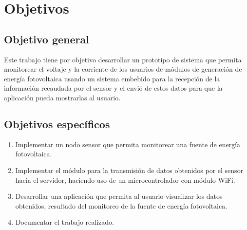 
\section{Objetivos}

\subsection{Objetivo general}
Este trabajo tiene por objetivo desarrollar un prototipo de sistema que permita monitorear el voltaje y la corriente de los usuarios de módulos de generación de energía fotovoltaica usando un sistema embebido para la recepción de la información recaudada por el sensor y el envió de estos datos para que la aplicación pueda mostrarlas al usuario.

\subsection{Objetivos específicos}
\begin{enumerate}[label=\arabic*.]
    \item Implementar un nodo sensor que permita monitorear una fuente de energía fotovoltaica.
    \item Implementar el módulo para la transmisión de datos obtenidos por el sensor hacia el servidor, haciendo uso de un microcontrolador con módulo WiFi. 
    \item Desarrollar una aplicación que permita al usuario visualizar los datos obtenidos, resultado del monitoreo de la fuente de energía fotovoltaica.
    \item Documentar el trabajo realizado.
\end{enumerate}
